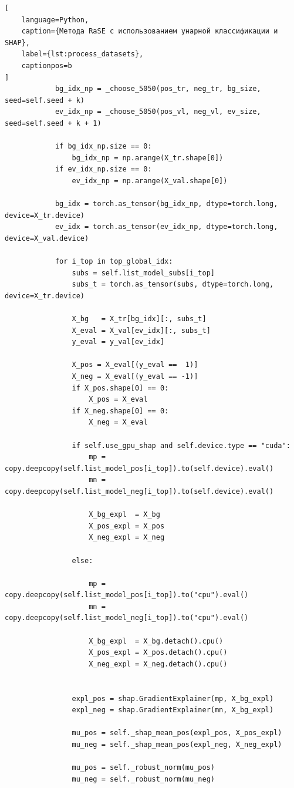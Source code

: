 \documentclass[12pt,a4paper]{article}
\begin{document}
\begin{lstlisting}[
    language=Python,
    caption={Метода RaSE с использованием унарной классификации и SHAP},
    label={lst:process_datasets},
    captionpos=b
]
            bg_idx_np = _choose_5050(pos_tr, neg_tr, bg_size, seed=self.seed + k)
            ev_idx_np = _choose_5050(pos_vl, neg_vl, ev_size, seed=self.seed + k + 1)

            if bg_idx_np.size == 0:
                bg_idx_np = np.arange(X_tr.shape[0])
            if ev_idx_np.size == 0:
                ev_idx_np = np.arange(X_val.shape[0])

            bg_idx = torch.as_tensor(bg_idx_np, dtype=torch.long, device=X_tr.device)
            ev_idx = torch.as_tensor(ev_idx_np, dtype=torch.long, device=X_val.device)

            for i_top in top_global_idx:
                subs = self.list_model_subs[i_top]
                subs_t = torch.as_tensor(subs, dtype=torch.long, device=X_tr.device)

                X_bg   = X_tr[bg_idx][:, subs_t]
                X_eval = X_val[ev_idx][:, subs_t]
                y_eval = y_val[ev_idx]

                X_pos = X_eval[(y_eval ==  1)]
                X_neg = X_eval[(y_eval == -1)]
                if X_pos.shape[0] == 0:
                    X_pos = X_eval
                if X_neg.shape[0] == 0:
                    X_neg = X_eval

                if self.use_gpu_shap and self.device.type == "cuda":
                    mp = copy.deepcopy(self.list_model_pos[i_top]).to(self.device).eval()
                    mn = copy.deepcopy(self.list_model_neg[i_top]).to(self.device).eval()

                    X_bg_expl  = X_bg  
                    X_pos_expl = X_pos
                    X_neg_expl = X_neg

                else:

                    mp = copy.deepcopy(self.list_model_pos[i_top]).to("cpu").eval()
                    mn = copy.deepcopy(self.list_model_neg[i_top]).to("cpu").eval()

                    X_bg_expl  = X_bg.detach().cpu()
                    X_pos_expl = X_pos.detach().cpu()
                    X_neg_expl = X_neg.detach().cpu()


                expl_pos = shap.GradientExplainer(mp, X_bg_expl)
                expl_neg = shap.GradientExplainer(mn, X_bg_expl)

                mu_pos = self._shap_mean_pos(expl_pos, X_pos_expl)
                mu_neg = self._shap_mean_pos(expl_neg, X_neg_expl)

                mu_pos = self._robust_norm(mu_pos)
                mu_neg = self._robust_norm(mu_neg)


\end{lstlisting}
\end{document}
